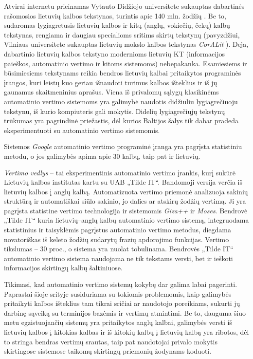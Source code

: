 \begin{multicols}{2}
   Atvirai internetu prieinamas Vytauto Didžiojo universitete sukauptas dabartinės rašomosios lietuvių kalbos tekstynas, turintis apie 140 mln. žodžių \cite{tekstynas}.  Be to, sudaromas lygiagretusis lietuvių kalbos ir kitų (anglų, vokiečių, čekų) kalbų tekstynas, rengiama ir daugiau specialioms sritims skirtų tekstynų (pavyzdžiui, Vilniaus universitete sukauptas lietuvių mokslo kalbos tekstynas \textit{CorALit} \cite{coralit}). Deja, dabartinio lietuvių kalbos tekstyno modernioms lietuvių KT (informacijos paieškos, automatinio vertimo ir kitoms sistemoms) nebepakanka. Esamiesiems ir būsimiesiems tekstynams reikia bendros lietuvių kalbai pritaikytos programinės įrangos, kuri leistų kuo geriau išnaudoti turimus kalbos išteklius ir iš jų gaunamus skaitmeninius aprašus. Viena iš privalomų sąlygų klasikinėms automatinio vertimo sistemoms yra galimybė naudotis didžiuliu lygiagrečiuoju tekstynu, iš kurio kompiuteris gali mokytis. Didelių lygiagrečiųjų tekstynų trūkumas yra pagrindinė priežastis, dėl kurios Baltijos šalys tik dabar pradeda eksperimentuoti su automatinio vertimo sistemomis.   

    Sistemos \textit{Google} automatinio vertimo programinė įranga yra pagrįsta statistiniu metodu, o jos galimybės apima apie 30 kalbų, taip pat ir lietuvių.   

   \textit{Vertimo vedlys}  – tai eksperimentinis automatinio vertimo įrankis, kurį sukūrė Lietuvių kalbos institutas kartu su UAB „Tilde IT“. Bandomoji versija verčia iš lietuvių kalbos į anglų kalbą. Automatizuota vertimo priemonė analizuoja sakinių struktūrą ir automatiškai siūlo sakinio, jo dalies ar atskirų žodžių vertimą. Ji yra pagrįsta statistine vertimo technologija ir sistemomis \textit{Giza++}  ir \textit{Moses}. Bendrovė „Tilde IT“ kuria lietuvių–anglų kalbų automatinio vertimo sistemą, integruodama statistinius ir taisyklėmis pagrįstus automatinio vertimo metodus, diegdama novatoriškas iš keleto žodžių sudarytų frazių apdorojimo funkcijas. Vertimo tikslumas – 30 proc., o sistema yra nuolat tobulinama. Bendrovės „Tilde IT“ automatinio vertimo sistema naudojama ne tik tekstams versti, bet ir ieškoti informacijos skirtingų kalbų šaltiniuose.   

    Tikimasi, kad automatinio vertimo sistemų kokybę dar galima labai pagerinti. Paprastai šioje srityje susiduriama su tokiomis problemomis, kaip galimybės pritaikyti kalbos išteklius tam tikrai sričiai ar naudotojo poreikiams, sukurti jų darbinę sąveiką su terminijos bazėmis ir vertimų atmintimi. Be to, dauguma šiuo metu egzistuojančių sistemų yra pritaikytos anglų kalbai, galimybės versti iš lietuvių kalbos į kitokias kalbas ir iš kitokių kalbų į lietuvių kalbą yra ribotos, dėl to stringa bendras vertimų srautas, taip pat naudotojai privalo mokytis skirtingose sistemose taikomų skirtingų priemonių žodynams koduoti.   


\end{multicols}
